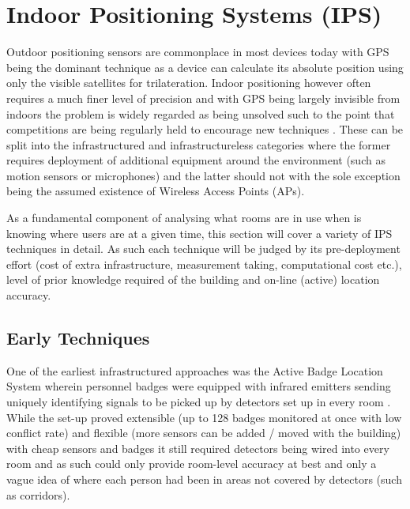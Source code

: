 \documentclass{UoYCSproject}
\begin{document}
        \section{Indoor Positioning Systems (IPS)}
        \label{sec:ips}
        
            Outdoor positioning sensors are commonplace in most devices today with GPS being the dominant technique as a device can calculate its absolute position using only the visible satellites for trilateration. Indoor positioning however often requires a much finer level of precision and with GPS being largely invisible from indoors the problem is widely regarded as being unsolved such to the point that competitions are being regularly held to encourage new techniques \citep{MSLOCComp}. These can be split into  the infrastructured and infrastructureless categories where the former requires deployment of additional equipment around the environment (such as motion sensors or microphones) and the latter should not with the sole exception being the assumed existence of Wireless Access Points (APs).
            
            As a fundamental component of analysing what rooms are in use when is knowing where users are at a given time, this section will cover a variety of IPS techniques in detail. As such each technique will be judged by its pre-deployment effort (cost of extra infrastructure, measurement taking, computational cost etc.), level of prior knowledge required of the building and on-line (active) location accuracy.
            
            \subsection{Early Techniques}
            \label{sec:early}
            
                One of the earliest infrastructured approaches was the Active Badge Location System wherein personnel badges were equipped with infrared emitters sending uniquely identifying signals to be picked up by detectors set up in every room \citep{want1992active}. While the set-up proved extensible (up to 128 badges monitored at once with low conflict rate) and flexible (more sensors can be added / moved with the building) with cheap sensors and badges it still required detectors being wired into every room and as such could only provide room-level accuracy at best and only a vague idea of where each person had been in areas not covered by detectors (such as corridors). 
            
\end{document}
